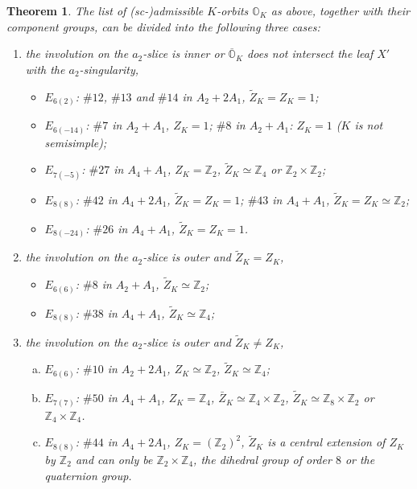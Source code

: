 \documentclass[12pt]{amsart}
\newcommand{\Orb}{\mathbb{O}}
\newcommand{\Z}{\mathbb{Z}}
\newtheorem{Thm}{Theorem}[subsection]
\theoremstyle{definition}
\numberwithin{equation}{section}
\begin{document}
\begin{Thm}\label{thm:exceptional}
The list of (sc-)admissible $K$-orbits $\Orb_K$ as above, together with their component groups, can be divided into the following three cases:  
\begin{enumerate}
\item[Case 1:]
the involution on the $a_2$-slice is inner or $\overline{\Orb}_K$ does not intersect the leaf $X'$ with the $a_2$-singularity,
\begin{itemize}
	\item 
	   $E_{6(2)}$: $\#12$, $\#13$ and $\#14$ in $A_2 + 2A_1$, $\tilde{Z}_K = Z_K = 1$;
	\item 
	    $E_{6(-14)}$: $\# 7$ in $A_2+A_1$, $Z_K= 1$; $\# 8$ in $A_2+A_1$: $Z_K= 1$ ($K$ is not semisimple);
	\item 
	    $E_{7(-5)}$: $\#27$ in $A_4 + A_1$, $Z_K = \Z_2$, $\tilde{Z}_K \simeq \Z_4$ or $\Z_2 \times \Z_2$; 
	\item 
	   	$E_{8(8)}$: $\#42$ in $A_4+2A_1$, $\tilde{Z}_K=Z_K =1$;  $\#43$ in $A_4+A_1$, $\tilde{Z}_K=Z_K \simeq \Z_2$;
	 \item 
	    $E_{8(-24)}$: $\#26$ in $A_4+A_1$, $\tilde{Z}_K=Z_K =1$.
\end{itemize}
\item[Case 2:]
the involution on the $a_2$-slice is outer and $\tilde{Z}_K = Z_K$,
\begin{itemize}
	\item 
	  $E_{6(6)}$: $\# 8$ in $A_2+A_1$, $\tilde{Z}_K \simeq \Z_2$;
	\item 
	  $E_{8(8)}$:  $\# 38$ in $A_4+A_1$, $\tilde{Z}_K \simeq \Z_4$;
\end{itemize}
\item[Case 3:]
the involution on the $a_2$-slice is outer and $\tilde{Z}_K \neq Z_K$,
\begin{enumerate}[(a)]
	\item 
	$E_{6(6)}$: $\# 10$ in $A_2+2A_1$, $Z_K \simeq \Z_2$, $\tilde{Z}_K \simeq \Z_4$;
	\item 
	$E_{7(7)}$: $\# 50$ in $A_4+A_1$, $Z_K = \Z_4$, $\bar{Z}_K \simeq \Z_4 \times \Z_2$, $\tilde{Z}_K \simeq \Z_8 \times \Z_2$ or $ \Z_4 \times \Z_4$.
	\item 
	$E_{8(8)}$: $\#44$ in $A_4 + 2A_1$, $Z_K = (\Z_2)^2$, $\tilde{Z}_K$ is a central extension of $Z_K$ by $\Z_2$ and can only be $\Z_2 \times \Z_4$, the dihedral group of order $8$ or the quaternion group.
\end{enumerate}

\end{enumerate}
\end{Thm}
\end{document}
